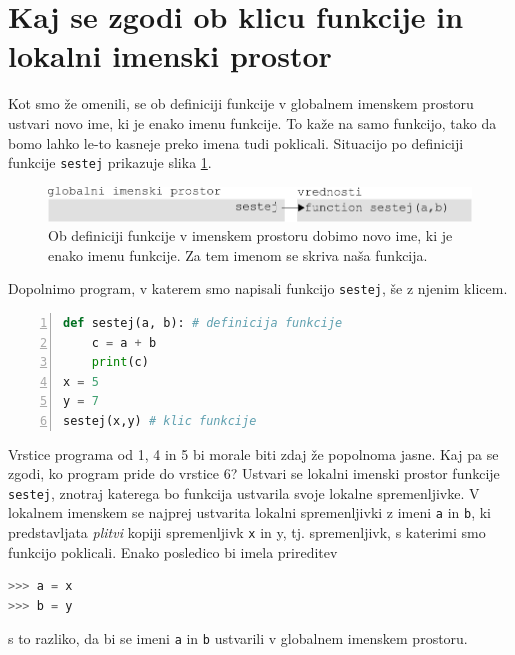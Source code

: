 \section{Kaj se zgodi ob klicu funkcije in lokalni imenski prostor}
Kot smo že omenili, se ob definiciji funkcije v globalnem imenskem prostoru ustvari novo ime, ki je enako imenu funkcije. To kaže na samo funkcijo, tako da bomo lahko le-to kasneje preko imena tudi poklicali. Situacijo po definiciji funkcije \texttt{sestej} prikazuje slika \ref{img:imenski_prostor_2}. \begin{figure}
    \includegraphics[width=\linewidth]{img/imenski_prostor_2.pdf}
    \caption{Ob definiciji funkcije v imenskem prostoru dobimo novo ime, ki je enako imenu funkcije. Za tem imenom se skriva naša funkcija.}
    \label{img:imenski_prostor_2}
\end{figure}

Dopolnimo program, v katerem smo napisali funkcijo \texttt{sestej}, še z njenim klicem.
\begin{lstlisting}[language=Python, showstringspaces=false,numbers=left]
def sestej(a, b): # definicija funkcije
    c = a + b
    print(c)
x = 5
y = 7
sestej(x,y) # klic funkcije
\end{lstlisting}
Vrstice programa od 1, 4 in 5 bi morale biti zdaj že popolnoma jasne. Kaj pa se zgodi, ko program pride do vrstice 6? Ustvari se lokalni imenski prostor funkcije \texttt{sestej}, znotraj katerega bo funkcija ustvarila svoje lokalne spremenljivke. V lokalnem imenskem se najprej ustvarita lokalni spremenljivki z imeni \texttt{a} in \texttt{b}, ki predstavljata \emph{plitvi} kopiji spremenljivk \texttt{x} in {y}, tj. spremenljivk, s katerimi smo funkcijo poklicali. Enako posledico bi imela prireditev
\begin{lstlisting}[language=Python, showstringspaces=false]
>>> a = x
>>> b = y
\end{lstlisting}
s to razliko, da bi se imeni \texttt{a} in \texttt{b} ustvarili v globalnem imenskem prostoru.

